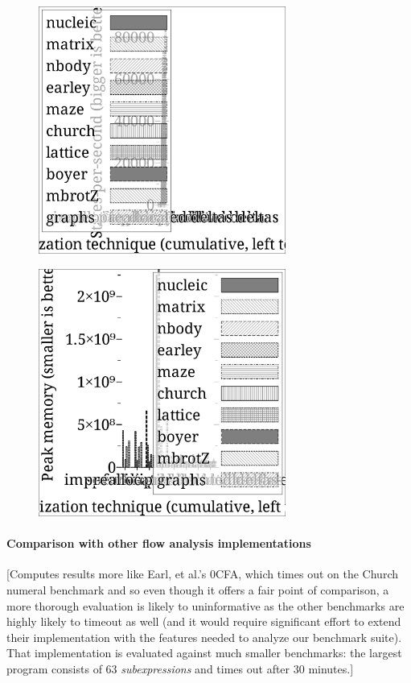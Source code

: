 \documentclass[preprint,onecolumn,9pt]{sigplanconf} %
\begin{document}
\begin{figure}
\begin{center}
\includegraphics[width=3.2in]{state-per-sec.ps}
\end{center}
\end{figure}

\begin{figure}
\begin{center}
\includegraphics[width=3.2in]{peak-mem.ps}
\end{center}
\end{figure}

\paragraph{Comparison with other flow analysis implementations}

[Computes results more like Earl, et al.'s 0CFA, which times out on
  the Church numeral benchmark and so even though it offers a fair
  point of comparison, a more thorough evaluation is likely to
  uninformative as the other benchmarks are highly likely to timeout
  as well (and it would require significant effort to extend their
  implementation with the features needed to analyze our benchmark
  suite).  That implementation is evaluated against much smaller
  benchmarks: the largest program consists of 63 \emph{subexpressions}
  and times out after 30 minutes.]
\end{document}
